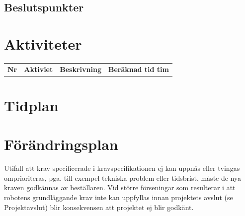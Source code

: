 \documentclass{article}
\begin{document}
\subsection{Beslutspunkter}
\begin{center}
\end{center}

\section{Aktiviteter}

\begin{table}[H]
 \begin{tabular}{| l | l | l | l |}
 \hline
 \textbf{Nr} & \textbf{Aktiviet} & \textbf{Beskrivning} & \textbf{Beräknad tid tim}
 \end{tabular}
\end{table}
\section{Tidplan}
\section{Förändringsplan}
Utifall att krav specificerade i kravspecifikationen ej kan uppnås eller tvingas omprioriteras, pga. till exempel tekniska problem eller tidsbrist, måste de nya kraven godkännas av beställaren. Vid större förseningar som resulterar i att robotens grundläggande krav inte kan uppfyllas innan projektets avslut (se Projektavslut) blir konsekvensen att projektet ej blir godkänt.
\end{document}
